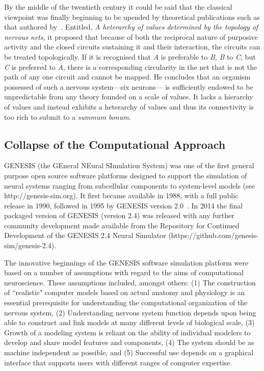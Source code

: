 \documentclass[11pt,3p,twocolumn]{JMN}
\begin{document}
By the middle of the twentieth century it could be said that the classical viewpoint was finally beginning to be upended by theoretical publications such as that authored by~\citet{mcculloch45}. Entitled, {\it{A heterarchy of values determined by the topology of nervous nets}}, it proposed that because of both the reciprocal nature of purposive activity and the closed circuits sustaining it and their interaction, the circuits can be treated topologically. If it is recognised that {\it{A}} is preferable to {\it{B}}, {\it{B}} to {\it{C}}, but {\it{C}} is preferred to {\it{A}}, there is a  corresponding circularity in the net that is not the path of any one circuit and cannot be mapped. He concludes that an organism possessed of such a nervous system---six neurons--- is sufficiently endowed to be unpredictable from any theory founded on a scale of values. It lacks a hierarchy of values and instead exhibits a heterarchy of values and thus its connectivity is too rich to submit to a {\it{summum bonum}}.

\subsection{Collapse of the Computational Approach}

GENESIS (the GEneral NEural SImulation System) was one of the first general purpose open source software platforms designed to support the simulation of neural systems ranging from subcellular components to system-level models (see http://genesis-sim.org). It first became available in 1988, with a full public release in 1990, followed in 1995 by GENESIS version 2.0~\citep{jung22}. In 2014 the final packaged version of GENESIS (version 2.4) was released with any further community development made available from the Repository for Continued Development of the GENESIS 2.4 Neural Simulator (https://github.com/genesis-sim/genesis-2.4).

The innovative beginnings of the GENESIS software simulation platform were based on a number of assumptions with regard to the aims of computational neuroscience. These assumptions included, amongst others: (1) The construction of ``realistic" computer models based on actual anatomy and physiology is an essential prerequisite for understanding the computational organization of the nervous system, (2) Understanding nervous system function depends upon being able to construct and link models at many different levels of biological scale, (3) Growth of a modeling system is reliant on the ability of individual modelers to develop and share model features and components, (4) The system should be as machine independent as possible, and (5) Successful use depends on a graphical interface that supports users with different ranges of computer expertise.
\end{document}

